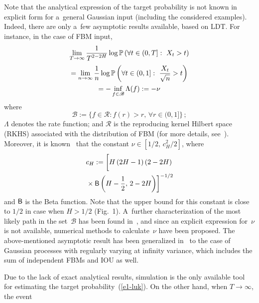 \begin{multicols}{2}
Note that the analytical expression of the target probability is 
not known in explicit form for a~general Gaussian input (including the 
considered examples). Indeed, there are only a~few asymptotic results available, 
based on LDT. For instance, in the case of FBM input,
\begin{multline}
\lim\limits_{T \to \infty} \displaystyle\frac{\displaystyle 1\mathstrut}{\displaystyle T^{2-2H}\mathstrut} \log\mathbb{P}\left( \forall t \in (0,T]:\,\,X_t > t \right)\\
=\lim_{n \to \infty} \displaystyle\frac{\displaystyle 1\mathstrut}{\displaystyle n\mathstrut}
 \log\mathbb{P}\left( \forall t \in (0,1]:\,\,\displaystyle\frac{\displaystyle X_t\mathstrut}{\displaystyle \sqrt{n}\mathstrut} > t \right)\\
=-\inf_{f \in \mathscr{B}} \Lambda(f):=-\nu\label{BMC-6}
\end{multline}
where
$$
\mathscr{B}:=\{f \in \mathcal{R} :  f(r) > r, \, \forall r \in (0,1]\}\,;
$$
$\Lambda$ denotes the rate function; and $\mathcal{R}$ is the reproducing 
kernel Hilbert space (RKHS) associated with the distribution of FBM 
(for more details, see~\cite{Deuschel}). Moreover, it is known~\cite{Norros} 
that the constant $\nu\in [{1}/{2},\,c^2_H/2]$, where
\begin{multline*}
c_H:=\left[ \vphantom{\fr{1}{2}}
H\,(2H-1)\,(2-2H)\right.\\
\left.{}\times{\sf B}\left(H-\fr{1}{2}, \,2-2H \right)  \right]^{-1/2} 
\end{multline*}
 and ${\sf B}$ is the Beta function. Note that the upper bound for this constant 
 is close to $1/2$ in case when $H>1/2$ (Fig.~1). 
 A~further characterization of the most likely path in the set~$\mathscr{B}$ 
 has been found in~\cite{Mandjes1}, and since an  explicit expression for~$\nu$ 
 is not available, numerical methods to calculate~$\nu$   have been proposed. 
 The above-mentioned  asymptotic result has been generalized in~\cite{Dieker2} 
 to the case of Gaussian processes with regularly varying at infinity variance, 
 which includes the sum of independent FBMs and IOU as well.
 
 Due to the lack of exact analytical results, simulation is the  only available
 tool for estimating the target probability~(\ref{e1-luk}). On the other hand, when 
 $T \to \infty$, the  event\linebreak\vspace*{-12pt}
 
  { \begin{center}  %
 \vspace*{12pt}
 \mbox{%
\epsfxsize=77.9mm
}


\vspace*{3pt}



\end{center}}
\end{multicols}
